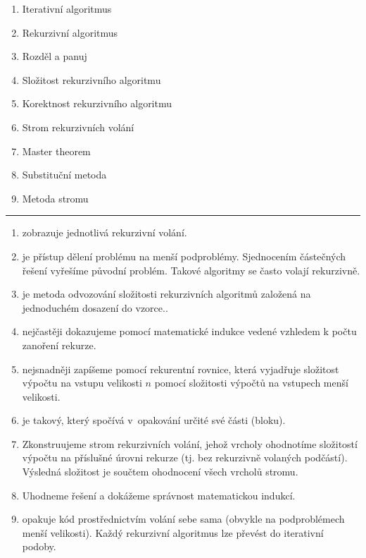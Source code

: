 \documentclass[12pt,a4paper,landscape]{article}
\begin{document}
\pagestyle{empty}

\setlength{\parindent}{0pt}
\setlength{\columnsep}{20pt}

\Large

\begin{multicols}{2}
\begin{enumerate}
\item Iterativní algoritmus
\item Rekurzivní algoritmus
\item Rozděl a panuj
\item Složitost rekurzivního algoritmu
\item Korektnost rekurzivního algoritmu
\item Strom rekurzivních volání
\item Master theorem
\item Substituční metoda
\item Metoda stromu
\end{enumerate}
\end{multicols}

\rule{\linewidth}{1pt}

\begin{multicols}{2}
\begin{enumerate}[label=\Alph*.]

\item zobrazuje jednotlivá rekurzivní volání.

\item je přístup dělení problému na menší podproblémy.
Sjednocením částečných řešení vyřešíme původní problém. Takové
algoritmy se často volají rekurzivně.
\item je metoda odvozování složitosti rekurzivních algoritmů založená na
jednoduchém dosazení do vzorce..
\item nejčastěji dokazujeme pomocí matematické indukce vedené vzhledem k počtu
zanoření rekurze.
\item nejsnadněji zapíšeme pomocí rekurentní rovnice, která vyjadřuje složitost
výpočtu na vstupu velikosti $n$ pomocí složitosti výpočtů na vstupech menší
velikosti.
\item je takový, který spočívá v~opakování určité své části (bloku).
\item Zkonstruujeme strom rekurzivních volání, jehož vrcholy ohodnotíme složitostí
výpočtu na příslušné úrovni rekurze (tj. bez rekurzivně volaných podčástí).
Výsledná složitost je součtem ohodnocení všech vrcholů stromu.
\item Uhodneme řešení a dokážeme správnost matematickou indukcí.
\item opakuje kód prostřednictvím volání sebe sama (obvykle na podproblémech menší
velikosti). Každý rekurzivní algoritmus lze převést do iterativní podoby.
\end{enumerate}

\end{multicols}
\end{document}
